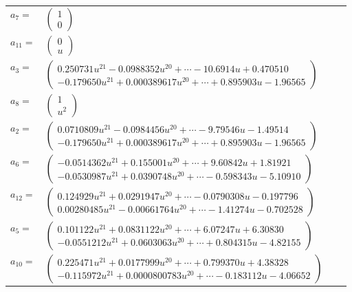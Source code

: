 \documentclass[1p]{elsarticle_modified}
\theoremstyle{definition}
\begin{document}
\begin{tabular}{m{7pt} m{180pt} m{7pt} m{180pt} }
\flushright $a_{7}=$&$\begin{pmatrix}1\\0\end{pmatrix}$ \\
\flushright $a_{11}=$&$\begin{pmatrix}0\\u\end{pmatrix}$ \\
\flushright $a_{3}=$&$\begin{pmatrix}0.250731 u^{21}-0.0988352 u^{20}+\cdots-10.6914 u+0.470510\\-0.179650 u^{21}+0.000389617 u^{20}+\cdots+0.895903 u-1.96565\end{pmatrix}$ \\
\flushright $a_{8}=$&$\begin{pmatrix}1\\u^2\end{pmatrix}$ \\
\flushright $a_{2}=$&$\begin{pmatrix}0.0710809 u^{21}-0.0984456 u^{20}+\cdots-9.79546 u-1.49514\\-0.179650 u^{21}+0.000389617 u^{20}+\cdots+0.895903 u-1.96565\end{pmatrix}$ \\
\flushright $a_{6}=$&$\begin{pmatrix}-0.0514362 u^{21}+0.155001 u^{20}+\cdots+9.60842 u+1.81921\\-0.0530987 u^{21}+0.0390748 u^{20}+\cdots-0.598343 u-5.10910\end{pmatrix}$ \\
\flushright $a_{12}=$&$\begin{pmatrix}0.124929 u^{21}+0.0291947 u^{20}+\cdots-0.0790308 u-0.197796\\0.00280485 u^{21}-0.00661764 u^{20}+\cdots-1.41274 u-0.702528\end{pmatrix}$ \\
\flushright $a_{5}=$&$\begin{pmatrix}0.101122 u^{21}+0.0831122 u^{20}+\cdots+6.07247 u+6.30830\\-0.0551212 u^{21}+0.0603063 u^{20}+\cdots+0.804315 u-4.82155\end{pmatrix}$ \\
\flushright $a_{10}=$&$\begin{pmatrix}0.225471 u^{21}+0.0177999 u^{20}+\cdots+0.799370 u+4.38328\\-0.115972 u^{21}+0.0000800783 u^{20}+\cdots-0.183112 u-4.06652\end{pmatrix}$ \\

\end{tabular}
\end{document}
